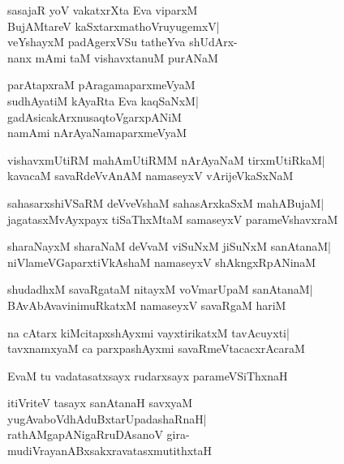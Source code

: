 \documentclass[twoside,12pt,openright]{book}
\newcounter{shloka}[chapter]
\begin{document}
\begin{shloka}%
sasajaR yoV vakatxrXta Eva viparxM\\
BujAMtareV kaSxtarxmathoVruyugemxV|\\
veYshayxM padAgerxVSu tatheYva shUdArx-\\
nanx mAmi taM vishavxtanuM purANaM
\end{shloka}

\begin{shloka}%
parAtapxraM pAragamaparxmeVyaM\\
sudhAyatiM kAyaRta Eva kaqSaNxM|\\
gadAsicakArxnusaqtoVgarxpANiM\\
namAmi nArAyaNamaparxmeVyaM
\end{shloka}

\begin{shloka}%
vishavxmUtiRM mahAmUtiRMM nArAyaNaM tirxmUtiRkaM|\\
kavacaM savaRdeVvAnAM namaseyxV vArijeVkaSxNaM
\end{shloka}

\begin{shloka}%
sahasarxshiVSaRM deVveVshaM sahasArxkaSxM mahABujaM|\\
jagatasxMvAyxpayx tiSaThxMtaM samaseyxV parameVshavxraM
\end{shloka}

\begin{shloka}%
sharaNayxM sharaNaM deVvaM viSuNxM jiSuNxM sanAtanaM|\\
niVlameVGaparxtiVkAshaM namaseyxV shAkngxRpANinaM
\end{shloka}

\begin{shloka}%
shudadhxM savaRgataM nitayxM voVmarUpaM sanAtanaM|\\
BAvAbAvavinimuRkatxM namaseyxV savaRgaM hariM
\end{shloka}

\begin{shloka}%
na cAtarx kiMcitapxshAyxmi vayxtirikatxM tavAcuyxti|\\
tavxnamxyaM ca parxpashAyxmi savaRmeVtacacxrAcaraM
\end{shloka}

\begin{shloka}%
EvaM tu vadatasatxsayx rudarxsayx parameVSiThxnaH
\end{shloka}

\begin{shloka}%
itiVriteV tasayx sanAtanaH savxyaM\\
yugAvaboVdhAduBxtarUpadashaRnaH|\\
rathAMgapANigaRruDAsanoV gira-\\
mudiVrayanABxsakxravatasxmutithxtaH
\end{shloka}
\end{document}
